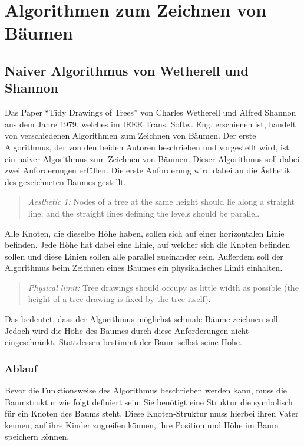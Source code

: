 \chapter{Algorithmen zum Zeichnen von Bäumen}
\label{chap:kapitel3}

\section{Naiver Algorithmus von Wetherell und Shannon}

Das Paper “Tidy Drawings of Trees” von Charles Wetherell und Alfred Shannon aus dem Jahre 1979, 
welches im IEEE Trans. Softw. Eng. erschienen ist, handelt von verschiedenen Algorithmen zum Zeichnen von Bäumen.
Der erste Algorithmus, der von den beiden Autoren beschrieben und vorgestellt wird, ist ein naiver Algorithmus 
zum Zeichnen von Bäumen. Dieser Algorithmus soll dabei zwei Anforderungen erfüllen. Die erste Anforderung wird dabei
an die Ästhetik des gezeichneten Baumes gestellt. 
\begin{quotation}
	\textit{Aesthetic 1:} Nodes of a tree at the same height should lie
	along a straight line, and the straight lines defining the levels
	should be parallel.\cite[]{q1}
\end{quotation}
Alle Knoten, die dieselbe Höhe haben, sollen sich auf einer horizontalen
Linie befinden. Jede Höhe hat dabei eine Linie, auf welcher sich die Knoten befinden sollen und diese Linien sollen alle
parallel zueinander sein. Außerdem soll der Algorithmus beim Zeichnen eines Baumes ein physikalisches Limit einhalten.
\begin{quotation}
	\textit{Physical limit:} Tree drawings should occupy as little width
	as possible (the height of a tree drawing is fixed by the tree
	itself).\cite[]{q1}
\end{quotation}
Das bedeutet, dass der Algorithmus möglichst schmale Bäume zeichnen soll. Jedoch wird die Höhe des Baumes durch diese Anforderungen
nicht eingeschränkt. Stattdessen bestimmt der Baum selbst seine Höhe. \cite[]{q1}


\subsection{Ablauf}
Bevor die Funktionsweise des Algorithmus beschrieben werden kann, muss die Baumstruktur 
wie folgt definiert sein: Sie benötigt eine Struktur die symbolisch für ein Knoten des Baums steht. 
Diese Knoten-Struktur muss hierbei ihren Vater kennen, auf ihre Kinder zugreifen können, ihre Position und
Höhe im Baum speichern können.

